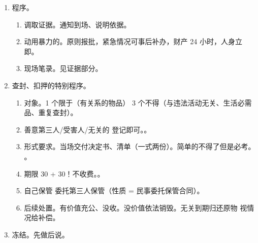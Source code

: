 \begin{enumerate}
\begin{enumerate}
\begin{enumerate}
\begin{enumerate}
                          \item 集中。集中行使了处罚权的综合执法机关可以实施与处罚权有关的强制措施权。
                                \begin{itemize}
                                  \item 处罚权 \yjt 是车，实施强制措施权 \yjt 车钥匙（附随义务）。送车得给车钥匙。
                                  \item 措 \yjt 罚 \yjt 执。只给处罚权，没给相应的措施权（），处罚权会被架空。
                                \end{itemize}
                        \end{enumerate}
                  \item 程序。
                        \begin{enumerate}
                          \item 调取证据。通知到场、说明依据。
                          \item 动用暴力的。原则报批，紧急情况可事后补办，财产 24 小时，人身立即。
                          \item 现场笔录。见证据部分。
                        \end{enumerate}
                  \item 查封、扣押的特别程序。
                        \begin{enumerate}
                          \item 对象。1 个限于（有关系的物品） 3 个不得（与违法活动无关、生活必需品、重复查封）。
                          \item 善意第三人/受害人/无关的 \yjt 登记即可。。
                          \item 形式要求。当场交付决定书、清单（一式两份）。简单的不得了但是必考。
                                。
                          \item 期限 30 + 30！不收费。。
                          \item 自己保管 \hz 委托第三人保管（性质 = 民事委托保管合同）。
                          \item 后续处置。\yi 有价值充公、没收。\er 没价值依法销毁。\san 无关到期归还原物 \hz 视情况给补偿。
                        \end{enumerate}
                  \item 冻结。先做后说。

\end{enumerate}
\end{enumerate}
\end{enumerate}

